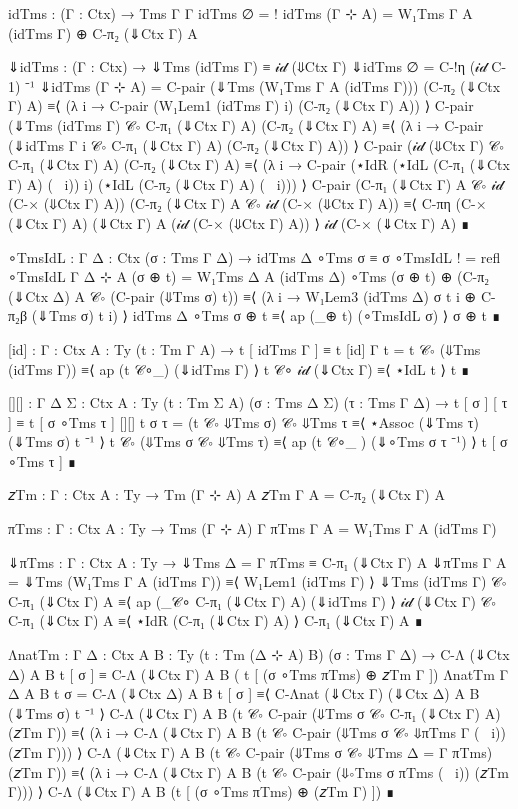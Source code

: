 \begin{code}[hide]
  idTms : (Γ : Ctx) → Tms Γ Γ
  idTms ∅ = !
  idTms (Γ ⊹ A) = W₁Tms Γ A (idTms Γ) ⊕ C-π₂ (⇓Ctx Γ) A

  ⇓idTms : (Γ : Ctx) → ⇓Tms (idTms Γ) ≡ 𝒾𝒹 (⇓Ctx Γ)
  ⇓idTms ∅ = C-!η (𝒾𝒹 C-1) ⁻¹
  ⇓idTms (Γ ⊹ A) =
    C-pair (⇓Tms (W₁Tms Γ A (idTms Γ))) (C-π₂ (⇓Ctx Γ) A)
      ≡⟨ (λ i → C-pair (W₁Lem1 (idTms Γ) i) (C-π₂ (⇓Ctx Γ) A)) ⟩
    C-pair (⇓Tms (idTms Γ) 𝒞∘ C-π₁ (⇓Ctx Γ) A) (C-π₂ (⇓Ctx Γ) A)
      ≡⟨ (λ i → C-pair (⇓idTms Γ i 𝒞∘ C-π₁ (⇓Ctx Γ) A) (C-π₂ (⇓Ctx Γ) A)) ⟩
    C-pair (𝒾𝒹 (⇓Ctx Γ) 𝒞∘ C-π₁ (⇓Ctx Γ) A) (C-π₂ (⇓Ctx Γ) A)
      ≡⟨ (λ i → C-pair (⋆IdR (⋆IdL (C-π₁ (⇓Ctx Γ) A) (~ i)) i) (⋆IdL (C-π₂ (⇓Ctx Γ) A) (~ i))) ⟩
    C-pair (C-π₁ (⇓Ctx Γ) A 𝒞∘ 𝒾𝒹 (C-× (⇓Ctx Γ) A)) (C-π₂ (⇓Ctx Γ) A 𝒞∘ 𝒾𝒹 (C-× (⇓Ctx Γ) A))
      ≡⟨ C-πη (C-× (⇓Ctx Γ) A) (⇓Ctx Γ) A (𝒾𝒹 (C-× (⇓Ctx Γ) A)) ⟩
    𝒾𝒹 (C-× (⇓Ctx Γ) A)
      ∎

  ∘TmsIdL : {Γ Δ : Ctx} (σ : Tms Γ Δ) → idTms Δ ∘Tms σ ≡ σ
  ∘TmsIdL ! = refl
  ∘TmsIdL {Γ} {Δ ⊹ A} (σ ⊕ t) =
    W₁Tms Δ A (idTms Δ) ∘Tms (σ ⊕ t) ⊕ (C-π₂ (⇓Ctx Δ) A 𝒞∘ (C-pair (⇓Tms σ) t))
      ≡⟨ (λ i → W₁Lem3 (idTms Δ) σ t i ⊕ C-π₂β (⇓Tms σ) t i) ⟩
    idTms Δ ∘Tms σ ⊕ t
      ≡⟨ ap (_⊕ t) (∘TmsIdL σ) ⟩
    σ ⊕ t
      ∎

  [id] : {Γ : Ctx} {A : Ty} (t : Tm Γ A) → t [ idTms Γ ] ≡ t
  [id] {Γ} t =
    t 𝒞∘ (⇓Tms (idTms Γ))
      ≡⟨ ap (t 𝒞∘_) (⇓idTms Γ) ⟩
    t 𝒞∘ 𝒾𝒹 (⇓Ctx Γ)
      ≡⟨ ⋆IdL t ⟩
    t
      ∎

  [][] : {Γ Δ Σ : Ctx} {A : Ty} (t : Tm Σ A) (σ : Tms Δ Σ) (τ : Tms Γ Δ) →
    t [ σ ] [ τ ] ≡ t [ σ ∘Tms τ ]
  [][] t σ τ =
    (t 𝒞∘ ⇓Tms σ) 𝒞∘ ⇓Tms τ
      ≡⟨ ⋆Assoc (⇓Tms τ) (⇓Tms σ) t ⁻¹ ⟩
    t 𝒞∘ (⇓Tms σ 𝒞∘ ⇓Tms τ)
      ≡⟨ ap (t 𝒞∘_ ) (⇓∘Tms σ τ ⁻¹) ⟩
    t [ σ ∘Tms τ ]
      ∎

  𝑧Tm : {Γ : Ctx} {A : Ty} → Tm (Γ ⊹ A) A
  𝑧Tm {Γ} {A} = C-π₂ (⇓Ctx Γ) A

  πTms : {Γ : Ctx} {A : Ty} → Tms (Γ ⊹ A) Γ
  πTms {Γ} {A} = W₁Tms Γ A (idTms Γ)

  ⇓πTms : {Γ : Ctx} {A : Ty} →
    ⇓Tms {Δ = Γ} πTms ≡ C-π₁ (⇓Ctx Γ) A
  ⇓πTms {Γ} {A} =
    ⇓Tms (W₁Tms Γ A (idTms Γ))
      ≡⟨ W₁Lem1  (idTms Γ) ⟩
    ⇓Tms (idTms Γ) 𝒞∘ C-π₁ (⇓Ctx Γ) A
      ≡⟨ ap (_𝒞∘ C-π₁ (⇓Ctx Γ) A) (⇓idTms Γ) ⟩
    𝒾𝒹 (⇓Ctx Γ) 𝒞∘ C-π₁ (⇓Ctx Γ) A
      ≡⟨ ⋆IdR (C-π₁ (⇓Ctx Γ) A) ⟩
    C-π₁ (⇓Ctx Γ) A
      ∎

  ΛnatTm : {Γ Δ : Ctx} {A B : Ty} (t : Tm (Δ ⊹ A) B) (σ : Tms Γ Δ) →
    C-Λ (⇓Ctx Δ) A B t [ σ ] ≡  C-Λ (⇓Ctx Γ) A B ( t [ (σ ∘Tms πTms) ⊕ 𝑧Tm {Γ} ])
  ΛnatTm {Γ} {Δ} {A} {B} t σ =
    C-Λ (⇓Ctx Δ) A B t [ σ ]
      ≡⟨ C-Λnat (⇓Ctx Γ) (⇓Ctx Δ) A B (⇓Tms σ) t ⁻¹ ⟩
    C-Λ (⇓Ctx Γ) A B (t 𝒞∘ C-pair (⇓Tms σ 𝒞∘ C-π₁ (⇓Ctx Γ) A) (𝑧Tm {Γ}))
      ≡⟨ (λ i → C-Λ (⇓Ctx Γ) A B (t 𝒞∘ C-pair (⇓Tms σ 𝒞∘ ⇓πTms {Γ} (~ i)) (𝑧Tm {Γ}))) ⟩
    C-Λ (⇓Ctx Γ) A B (t 𝒞∘ C-pair (⇓Tms σ 𝒞∘ ⇓Tms {Δ = Γ} πTms) (𝑧Tm {Γ}))
      ≡⟨ (λ i → C-Λ (⇓Ctx Γ) A B (t 𝒞∘ C-pair (⇓∘Tms σ πTms (~ i)) (𝑧Tm {Γ}))) ⟩
    C-Λ (⇓Ctx Γ) A B (t [ (σ ∘Tms πTms) ⊕ (𝑧Tm {Γ}) ])
      ∎


\end{code}
